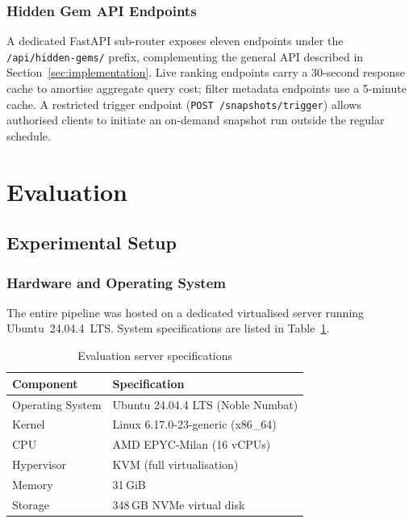 \documentclass[sigconf]{acmart}
\begin{document}
\subsubsection{Hidden Gem API Endpoints}

A dedicated FastAPI sub-router exposes eleven endpoints under the
\texttt{/api/hidden-gems/} prefix, complementing the general API described in
Section~\ref{sec:implementation}. Live ranking endpoints carry a 30-second
response cache to amortise aggregate query cost; filter metadata endpoints use a
5-minute cache. A restricted trigger endpoint (\texttt{POST /snapshots/trigger})
allows authorised clients to initiate an on-demand snapshot run outside the
regular schedule.

\newpage

\section{Evaluation}
\label{sec:evaluation}

\subsection{Experimental Setup}

\subsubsection{Hardware and Operating System}
The entire pipeline was hosted on a dedicated virtualised server running Ubuntu~24.04.4~LTS. System specifications are listed in Table~\ref{tab:system_specs}.

\begin{table}[ht]
  \caption{Evaluation server specifications}
  \label{tab:system_specs}
  \begin{tabularx}{\linewidth}{l X}
    \toprule
    \textbf{Component} & \textbf{Specification} \\
    \midrule
    Operating System & Ubuntu 24.04.4 LTS (Noble Numbat) \\
    Kernel           & Linux 6.17.0-23-generic (x86\_64) \\
    CPU              & AMD EPYC-Milan (16 vCPUs) \\
    Hypervisor       & KVM (full virtualisation) \\
    Memory           & 31\,GiB \\
    Storage          & 348\,GB NVMe virtual disk \\
    \bottomrule
  \end{tabularx}
\end{table}
\end{document}
